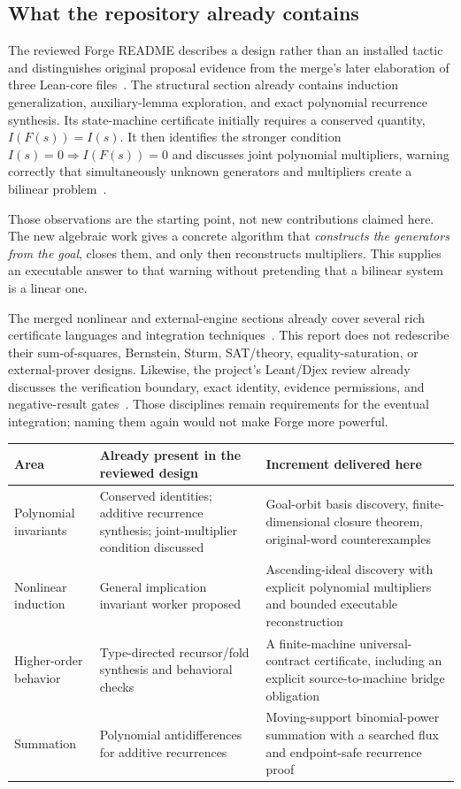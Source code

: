 \subsection{What the repository already contains}

The reviewed Forge README describes a design rather than an installed tactic and distinguishes original proposal evidence from the merge's later elaboration of three Lean-core files~\cite{forge-readme}. The structural section already contains induction generalization, auxiliary-lemma exploration, and exact polynomial recurrence synthesis. Its state-machine certificate initially requires a conserved quantity, $I(F(s))=I(s)$. It then identifies the stronger condition $I(s)=0\Rightarrow I(F(s))=0$ and discusses joint polynomial multipliers, warning correctly that simultaneously unknown generators and multipliers create a bilinear problem~\cite{forge-structural}.

Those observations are the starting point, not new contributions claimed here. The new algebraic work gives a concrete algorithm that \emph{constructs the generators from the goal}, closes them, and only then reconstructs multipliers. This supplies an executable answer to that warning without pretending that a bilinear system is a linear one.

The merged nonlinear and external-engine sections already cover several rich certificate languages and integration techniques~\cite{forge-nonlinear,forge-external}. This report does not redescribe their sum-of-squares, Bernstein, Sturm, SAT/theory, equality-saturation, or external-prover designs. Likewise, the project's Leant/Djex review already discusses the verification boundary, exact identity, evidence permissions, and negative-result gates~\cite{forge-neighbors}. Those disciplines remain requirements for the eventual integration; naming them again would not make Forge more powerful.

\begin{center}
\small
\begin{tabularx}{\textwidth}{@{}p{}XX@{}}
\toprule
Area & Already present in the reviewed design & Increment delivered here\\
\midrule
Polynomial invariants & Conserved identities; additive recurrence synthesis; joint-multiplier condition discussed & Goal-orbit basis discovery, finite-dimensional closure theorem, original-word counterexamples\\
Nonlinear induction & General implication invariant worker proposed & Ascending-ideal discovery with explicit polynomial multipliers and bounded executable reconstruction\\
Higher-order behavior & Type-directed recursor/fold synthesis and behavioral checks & A finite-machine universal-contract certificate, including an explicit source-to-machine bridge obligation\\
Summation & Polynomial antidifferences for additive recurrences & Moving-support binomial-power summation with a searched flux and endpoint-safe recurrence proof\\
\bottomrule
\end{tabularx}
\end{center}

